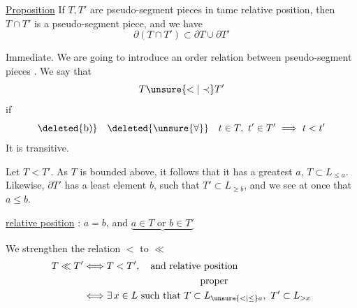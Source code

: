 \noindent\llap{\rule[-1.05\baselineskip]{0.4pt}{1.85\baselineskip}\hspace{0.65em}}\uline{Proposition} If $T,T'$ are pseudo-segment pieces in tame relative position, then $T\cap T'$ is  a pseudo-segment piece, and we have
\[
\partial(T\cap T')\subset\partial T\cup\partial T'
\]

Immediate. We are going to introduce an order relation between pseudo-segment pieces . We say that
\[
T\unsure{<|\prec}T'
\]
if 
\[
\deleted{\text{b)}}\quad\deleted{\unsure{\forall}}\quad t\in T,\ t'\in T'\implies t<t'
\]
It is  transitive.

Let $T<T'$. As $T$ is bounded above, it follows that  it has a greatest   $a$,   $T\subset L_{\leq a}$.  Likewise, $\partial T'$ has a least element $b$, such that $T'\subset L_{\geq b}$,   and we see at once that $a\leq b$.

\uline{  relative position} : $a=b$, and $\underbrace{a\in T\text{ or }b\in T'}$%


We strengthen the relation $<$ to $\ll$
\[
\begin{aligned}
T\ll T' &\Longleftrightarrow T<T',\quad\text{and relative position}\\
&\hspace{12em}\text{proper}\\
&\Longleftrightarrow \exists\,x\in L\text{ such that }T\subset L_{\unsure{<|\leq}a},\ T'\subset L_{>x}
\end{aligned}
\]
